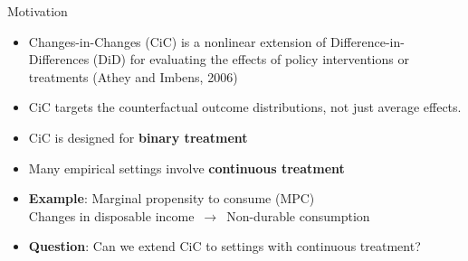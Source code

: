\documentclass[aspectratio=1610, 9pt]{beamer}
\begin{document}
\begin{frame}{Motivation}

\begin{itemize}

\item Changes-in-Changes (CiC) is a nonlinear extension of Difference-in-Differences (DiD) for evaluating the effects of policy interventions or treatments (Athey and Imbens, 2006)
\vspace{0.02cm}
\item CiC targets the counterfactual outcome distributions, not just average effects.
\vspace{0.02cm}

\item CiC is designed for \textbf{binary treatment}
\vspace{0.02cm}
\item Many empirical settings involve \textbf{continuous treatment}
\vspace{0.02cm}
\item \textbf{Example}: Marginal propensity to consume (MPC) \\
  Changes in disposable income\ $\to$\ Non-durable consumption
  \vspace{0.02cm}
  \item \textbf{ Question}: Can we extend CiC to settings with continuous treatment?



\end{itemize}

\end{frame}
\end{document}
